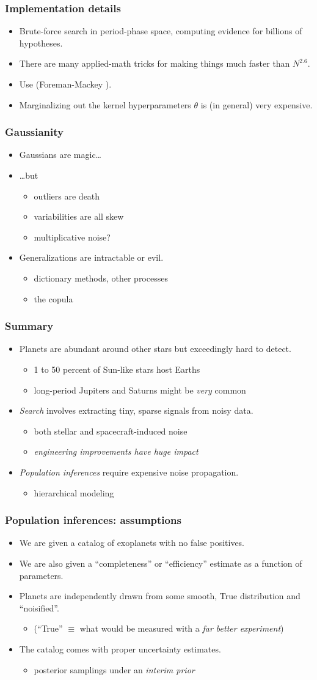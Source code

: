\documentclass[pdftex]{beamer}
\newcommand{\conclusions}{%
\begin{frame}
  \frametitle{Summary}
  \begin{itemize}
  \item Planets are abundant around other stars but exceedingly hard to detect.
    \begin{itemize}
    \item 1 to 50 percent of Sun-like stars host Earths
    \item long-period Jupiters and Saturns might be \emph{very} common
    \end{itemize}
  \item \emph{Search} involves extracting tiny, sparse signals from noisy data.
    \begin{itemize}
    \item both stellar and spacecraft-induced noise
    \item \emph{engineering improvements have huge impact}
    \end{itemize}
  \item \emph{Population inferences} require expensive noise propagation.
    \begin{itemize}
    \item hierarchical modeling
    \end{itemize}
  \end{itemize}
\end{frame}}
\begin{document}
\begin{frame}
  \frametitle{Implementation details}
  \begin{itemize}
  \item Brute-force search in period-phase space, computing evidence for billions of hypotheses.
  \item There are many applied-math tricks for making things much
    faster than $N^{2.6}$.
  \item Use  {\footnotesize (Foreman-Mackey \etal)}.
  \item Marginalizing out the kernel hyperparameters $\theta$ is (in
    general) very expensive.
  \end{itemize}
\end{frame}

\begin{frame}
  \frametitle{Gaussianity}
  \begin{itemize}
  \item Gaussians are magic\ldots
  \item \ldots but
    \begin{itemize}
    \item outliers are death
    \item variabilities are all skew
    \item multiplicative noise?
    \end{itemize}
  \item Generalizations are intractable or evil.
    \begin{itemize}
    \item dictionary methods, other processes
    \item the copula
    \end{itemize}
  \end{itemize}
\end{frame}

\conclusions

\begin{frame}
  \frametitle{Population inferences: assumptions}
  \begin{itemize}
  \item We are given a catalog of exoplanets with no false positives.
  \item We are also given a ``completeness'' or ``efficiency'' estimate as a function of parameters.
  \item Planets are independently drawn from some smooth, True distribution and ``noisified''.
    \begin{itemize}
    \item (``True'' $\equiv$ what would be measured with a \emph{far better experiment})
    \end{itemize}
  \item The catalog comes with proper uncertainty estimates.
    \begin{itemize}
    \item posterior samplings under an \emph{interim prior}
    \end{itemize}
  \end{itemize}
\end{frame}
\end{document}
